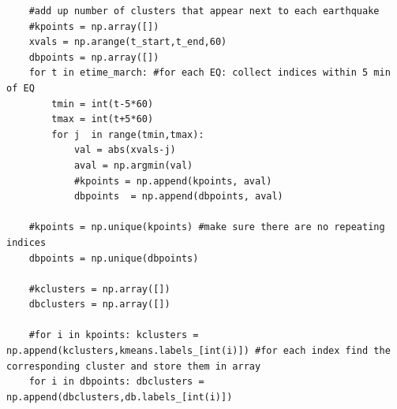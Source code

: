 \documentclass[colorlinks=true,pdfstartview=FitV,linkcolor=blue,
            citecolor=red,urlcolor=magenta]{ligodoc}
\begin{document}
\begin{verbatim}
    #add up number of clusters that appear next to each earthquake
    #kpoints = np.array([])
    xvals = np.arange(t_start,t_end,60)
    dbpoints = np.array([])
    for t in etime_march: #for each EQ: collect indices within 5 min of EQ
        tmin = int(t-5*60)
        tmax = int(t+5*60)
        for j  in range(tmin,tmax):
            val = abs(xvals-j)
            aval = np.argmin(val)
            #kpoints = np.append(kpoints, aval)
            dbpoints  = np.append(dbpoints, aval)
        
    #kpoints = np.unique(kpoints) #make sure there are no repeating indices
    dbpoints = np.unique(dbpoints)

    #kclusters = np.array([])
    dbclusters = np.array([])

    #for i in kpoints: kclusters = np.append(kclusters,kmeans.labels_[int(i)]) #for each index find the corresponding cluster and store them in array 
    for i in dbpoints: dbclusters = np.append(dbclusters,db.labels_[int(i)])
        

\end{verbatim}
\end{document}

